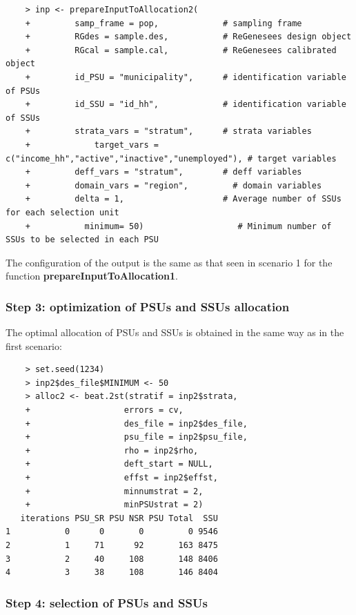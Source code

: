 \begin{verbatim}
	> inp <- prepareInputToAllocation2(
	+         samp_frame = pop,             # sampling frame
	+         RGdes = sample.des,           # ReGenesees design object
	+         RGcal = sample.cal,           # ReGenesees calibrated object
	+         id_PSU = "municipality",      # identification variable of PSUs
	+         id_SSU = "id_hh",             # identification variable of SSUs
	+         strata_vars = "stratum",      # strata variables
	+             target_vars = c("income_hh","active","inactive","unemployed"), # target variables
	+         deff_vars = "stratum",        # deff variables
	+         domain_vars = "region",         # domain variables
	+         delta = 1,                    # Average number of SSUs for each selection unit
	+           minimum= 50)                   # Minimum number of SSUs to be selected in each PSU
\end{verbatim}

The configuration of the output is the same as that seen in scenario 1 for the function \textbf{prepareInputToAllocation1}.

\subsubsection{Step 3: optimization of PSUs and SSUs allocation}

The optimal allocation of PSUs and SSUs is obtained in the same way as in the first scenario: 

\begin{verbatim}
	> set.seed(1234)
	> inp2$des_file$MINIMUM <- 50
	> alloc2 <- beat.2st(stratif = inp2$strata, 
	+                   errors = cv, 
	+                   des_file = inp2$des_file, 
	+                   psu_file = inp2$psu_file, 
	+                   rho = inp2$rho, 
	+                   deft_start = NULL, 
	+                   effst = inp2$effst,
	+                   minnumstrat = 2, 
	+                   minPSUstrat = 2)
   iterations PSU_SR PSU NSR PSU Total  SSU
1           0      0       0         0 9546
2           1     71      92       163 8475
3           2     40     108       148 8406
4           3     38     108       146 8404
\end{verbatim}


\subsubsection{Step 4: selection of PSUs and SSUs}

